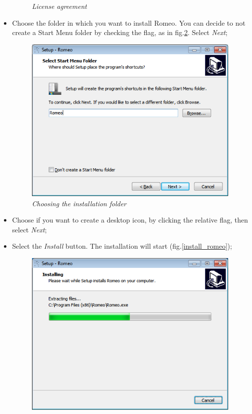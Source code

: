 \begin{itemize}
\begin{figure}[!h]
\begin{center}
\caption{\textit{License agreement}}
\label{license}
\end{center}
\end{figure}
\pagebreak
\item Choose the folder in which you want to install Romeo. You can decide to not create a Start Menu folder by checking the flag, as in fig.\ref{folder}. Select \textit{Next};
\begin{figure}[!h]
\begin{center}
\includegraphics[scale=0.7]{./Images/folder}
\caption{\textit{Choosing the installation folder}}
\label{folder}
\end{center}
\end{figure}
\item Choose if you want to create a desktop icon, by clicking the relative flag, then select \textit{Next};
\item Select the \textit{Install} button. The installation will start (fig.\ref{install_romeo});
\begin{figure}[!h]
\begin{center}
\includegraphics[scale=0.7]{./Images/installing}

\end{center}
\end{figure}
\end{itemize}
